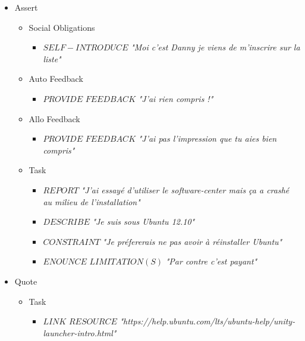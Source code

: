 \begin{itemize}
	\item Assert
		\begin{itemize}
			\item Social Obligations
				\begin{itemize}
					\item $SELF-INTRODUCE$
						\newline \textit{"Moi c'est Danny je viens de m'inscrire sur la liste"}
				\end{itemize}
			\item Auto Feedback
				\begin{itemize}
					\item $PROVIDE$ $FEEDBACK$
						\newline \textit{"J'ai rien compris !"}
				\end{itemize}
			\item Allo Feedback
				\begin{itemize}
					\item $PROVIDE$ $FEEDBACK$
						\newline \textit{"J'ai pas l'impression que tu aies bien compris"}
				\end{itemize}
			\item Task
				\begin{itemize}
					\item $REPORT$
						\newline \textit{"J'ai essayé d'utiliser le software-center mais ça a crashé au milieu de l'installation"}
					\item $DESCRIBE$
						\newline \textit{"Je suis sous Ubuntu 12.10"}
					\item $CONSTRAINT$
						\newline \textit{"Je préfererais ne pas avoir à réinstaller Ubuntu"}
					\item $ENOUNCE$ $LIMITATION(S)$
						\newline \textit{"Par contre c'est payant"}
				\end{itemize}
		\end{itemize}
	\item Quote
		\begin{itemize}
			\item Task
				\begin{itemize}
					\item $LINK$ $RESOURCE$
						\newline \textit{"https://help.ubuntu.com/lts/ubuntu-help/unity-launcher-intro.html"}

\end{itemize}
\end{itemize}
\end{itemize}
